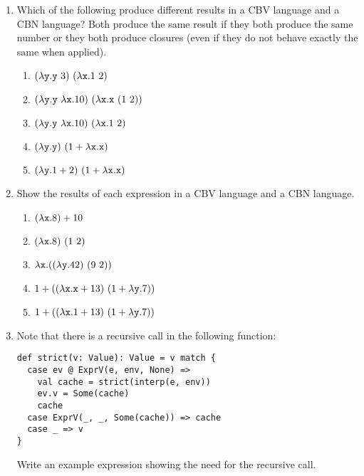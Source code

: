 \begin{enumerate}
\item Which of the following produce different results in a
 CBV language and a CBN language? Both produce the
 same result if they both produce the same number or they both produce
 closures (even if they do not behave exactly the same
 when applied).

\begin{enumerate}
  \item $(\lambda\texttt{y}.\texttt{y}\ 3)\ (\lambda\texttt{x}.1\ 2)$
  \item
    $(\lambda\texttt{y}.\texttt{y}\ \lambda\texttt{x}.10)\ (\lambda\texttt{x}.\texttt{x}\ (1\ 2))$
  \item
    $(\lambda\texttt{y}.\texttt{y}\ \lambda\texttt{x}.10)\ (\lambda\texttt{x}.1\ 2)$
  \item
    $(\lambda\texttt{y}.\texttt{y})\ (1+\lambda\texttt{x}.\texttt{x})$
  \item
    $(\lambda\texttt{y}.1+2)\ (1+\lambda\texttt{x}.\texttt{x})$
\end{enumerate}

\item Show the results of each expression in a CBV language and a CBN language.

\begin{enumerate}
  \item $(\lambda\texttt{x}.8)+10$
  \item $(\lambda\texttt{x}.8)\ (1\ 2)$
  \item $\lambda\texttt{x}.((\lambda\texttt{y}.42)\ (9\ 2))$
  \item
    $1+((\lambda\texttt{x}.\texttt{x}+13)\ (1+\lambda\texttt{y}.7))$
  \item
    $1+((\lambda\texttt{x}.1+13)\ (1+\lambda\texttt{y}.7))$
\end{enumerate}

\item Note that there is a recursive call in the following function:

\begin{verbatim}
def strict(v: Value): Value = v match {
  case ev @ ExprV(e, env, None) =>
    val cache = strict(interp(e, env))
    ev.v = Some(cache)
    cache
  case ExprV(_, _, Some(cache)) => cache
  case _ => v
}
\end{verbatim}

Write an example \lang expression showing the need for the recursive  call.


\end{enumerate}
